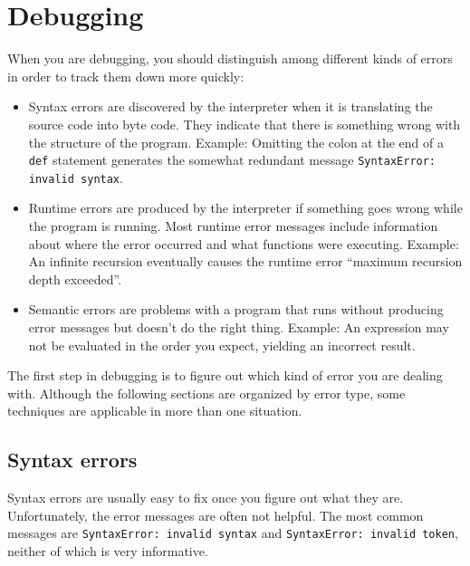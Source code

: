 

\chapter{Debugging}

When you are debugging, you should distinguish among different
kinds of errors in order to track them down more quickly:

\begin{itemize}

\item Syntax errors are discovered by the interpreter when it is
  translating the source code into byte code.  They indicate
  that there is something wrong with the structure of the program.
  Example: Omitting the colon at the end of a {\tt def} statement
  generates the somewhat redundant message {\tt SyntaxError: invalid
    syntax}.

\item Runtime errors are produced by the interpreter if something goes
  wrong while the program is running.  Most runtime error messages
  include information about where the error occurred and what
  functions were executing.  Example: An infinite recursion eventually
  causes the runtime error ``maximum recursion depth exceeded''.

\item Semantic errors are problems with a program that runs without
  producing error messages but doesn't do the right thing.  Example:
  An expression may not be evaluated in the order you expect, yielding
  an incorrect result.

\end{itemize}

The first step in debugging is to figure out which kind of
error you are dealing with.  Although the following sections are
organized by error type, some techniques are
applicable in more than one situation.


\section{Syntax errors}

Syntax errors are usually easy to fix once you figure out what they
are.  Unfortunately, the error messages are often not helpful.
The most common messages are {\tt SyntaxError: invalid syntax} and
{\tt SyntaxError: invalid token}, neither of which is very informative.

